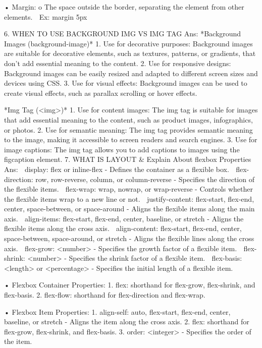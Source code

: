 •	Margin: 
o	The space outside the border, separating the element from other elements.
	Ex: margin 5px

6.	WHEN TO USE BACKGROUND IMG VS IMG TAG
Ans: 
*Background Images (background-image)*
1. Use for decorative purposes: Background images are suitable for decorative elements, such as textures, patterns, or gradients, that don't add essential meaning to the content.
2. Use for responsive designs: Background images can be easily resized and adapted to different screen sizes and devices using CSS.
3. Use for visual effects: Background images can be used to create visual effects, such as parallax scrolling or hover effects.

*Img Tag (<img>)*
1. Use for content images: The img tag is suitable for images that add essential meaning to the content, such as product images, infographics, or photos.
2. Use for semantic meaning: The img tag provides semantic meaning to the image, making it accessible to screen readers and search engines.
3. Use for image captions: The img tag allows you to add captions to images using the figcaption element.
7.   WHAT IS LAYOUT & Explain About flexbox Properties
Ans:
	display: flex or inline-flex - Defines the container as a flexible box.
	flex-direction: row, row-reverse, column, or column-reverse - Specifies the direction of the flexible items.
	flex-wrap: wrap, nowrap, or wrap-reverse - Controls whether the flexible items wrap to a new line or not.
	justify-content: flex-start, flex-end, center, space-between, or space-around - Aligns the flexible items along the main axis.
	align-items: flex-start, flex-end, center, baseline, or stretch - Aligns the flexible items along the cross axis.
	align-content: flex-start, flex-end, center, space-between, space-around, or stretch - Aligns the flexible lines along the cross axis.
	flex-grow: <number> - Specifies the growth factor of a flexible item.
	flex-shrink: <number> - Specifies the shrink factor of a flexible item.
	flex-basis: <length> or <percentage> - Specifies the initial length of a flexible item.

•	Flexbox Container Properties:
1.	flex: shorthand for flex-grow, flex-shrink, and flex-basis.
2.	flex-flow: shorthand for flex-direction and flex-wrap.

•	Flexbox Item Properties:
1.	align-self: auto, flex-start, flex-end, center, baseline, or stretch - Aligns the item along the cross axis.
2.	flex: shorthand for flex-grow, flex-shrink, and flex-basis.
3.	order: <integer> - Specifies the order of the item.


